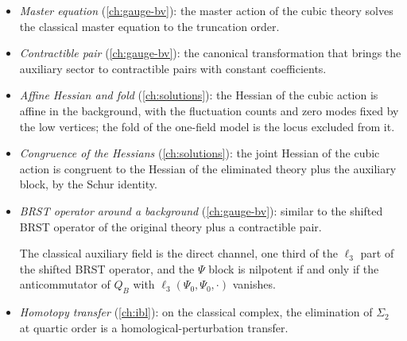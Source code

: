\begin{itemize}
  \setlength{\itemsep}{1ex}

  \item \emph{Master equation} (\cref{ch:gauge-bv}): the master action of the cubic theory solves the classical master equation to the truncation order.


  \item \emph{Contractible pair} (\cref{ch:gauge-bv}): the canonical transformation that brings the auxiliary sector to contractible pairs with constant coefficients.


  \item \emph{Affine Hessian and fold} (\cref{ch:solutions}): the Hessian of the cubic action is affine in the background, with the fluctuation counts and zero modes fixed by the low vertices; the fold of the one-field model is the locus excluded from it.


  \item \emph{Congruence of the Hessians} (\cref{ch:solutions}): the joint Hessian of the cubic action is congruent to the Hessian of the eliminated theory plus the auxiliary block, by the Schur identity.


  \item \emph{BRST operator around a background} (\cref{ch:gauge-bv}): similar to the shifted BRST operator of the original theory plus a contractible pair.


    The classical auxiliary field is the direct channel, one third of the $\ell_3$ part of the shifted BRST operator, and the $\Psi$ block is nilpotent if and only if the anticommutator of $Q_B$ with $\ell_3(\Psi_0, \Psi_0, \cdot)$ vanishes.


  \item \emph{Homotopy transfer} (\cref{ch:ibl}): on the classical complex, the elimination of $\Sigma_2$ at quartic order is a homological-perturbation transfer.


\end{itemize}
